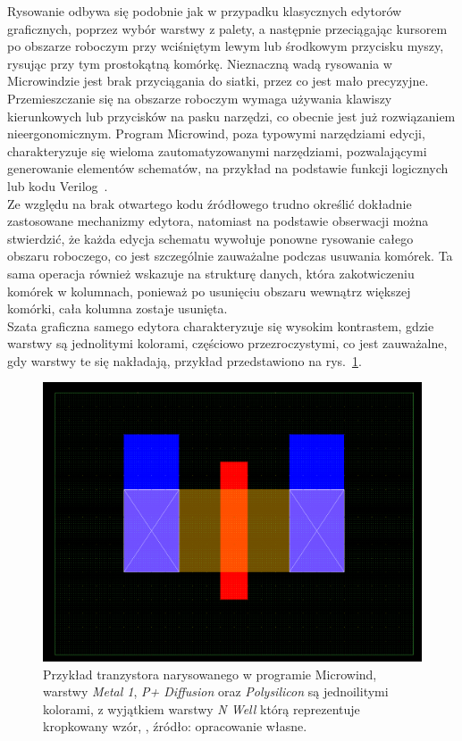 \indent Rysowanie odbywa się podobnie jak w przypadku klasycznych edytorów graficznych,
poprzez wybór warstwy z palety,
a następnie przeciągając kursorem po obszarze roboczym przy wciśniętym lewym lub środkowym przycisku myszy,
rysując przy tym prostokątną komórkę.
Nieznaczną wadą rysowania w Microwindzie jest brak przyciągania do siatki,
przez co jest mało precyzyjne.
Przemieszczanie się na obszarze roboczym wymaga używania klawiszy kierunkowych lub przycisków na pasku narzędzi,
co obecnie jest już rozwiązaniem nieergonomicznym.
Program Microwind, poza typowymi narzędziami edycji, charakteryzuje się wieloma zautomatyzowanymi narzędziami,
pozwalającymi generowanie elementów schematów,
na przykład na podstawie funkcji logicznych lub kodu Verilog~\cite{microwind_operation_commands}.\\
\indent Ze względu na brak otwartego kodu źródłowego trudno określić dokładnie zastosowane mechanizmy edytora,
natomiast na podstawie obserwacji można stwierdzić,
że każda edycja schematu wywołuje ponowne rysowanie całego obszaru roboczego,
co jest szczególnie zauważalne podczas usuwania komórek.
Ta sama operacja również wskazuje na strukturę danych, która zakotwiczeniu komórek w kolumnach,
ponieważ po usunięciu obszaru wewnątrz większej komórki, cała kolumna zostaje usunięta.\\
\indent Szata graficzna samego edytora charakteryzuje się wysokim kontrastem,
gdzie warstwy są jednolitymi kolorami, częściowo przezroczystymi,
co jest zauważalne, gdy warstwy te się nakładają, przykład przedstawiono na rys.~\ref{fig:microwind_tran}.

\begin{figure}[h]
    \centering
    \includegraphics[width=.9\textwidth]{chapters/chapter2/img/microwind_tran}
    \caption[Przykład tranzystora narysowanego w programie Microwind.]
    {
        Przykład tranzystora narysowanego w programie Microwind,
        warstwy \textit{Metal 1}, \textit{P+ Diffusion} oraz \textit{Polysilicon} są jednoilitymi kolorami,
        z wyjątkiem warstwy \textit{N Well} którą reprezentuje kropkowany wzór,
        , źródło: opracowanie własne.
    }
    \label{fig:microwind_tran}
\end{figure}
